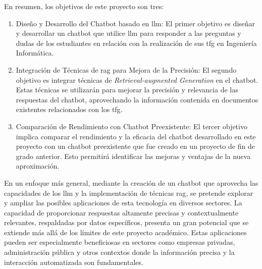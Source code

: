 En resumen, los objetivos de este proyecto son tres:
\begin{enumerate}
    \item Diseño y Desarrollo del Chatbot basado en \acrshort{llm}: El primer objetivo es diseñar y desarrollar un chatbot que utilice \acrlong{llm} para responder a las preguntas y dudas de los estudiantes en relación con la realización de sus \acrlong{tfg} en Ingeniería Informática.
    
    \item Integración de Técnicas de \acrshort{rag} para Mejora de la Precisión: El segundo objetivo es integrar técnicas de \textit{Retrieval-augmented Generation} en el chatbot. Estas técnicas se utilizarán para mejorar la precisión y relevancia de las respuestas del chatbot, aprovechando la información contenida en documentos existentes relacionados con los \acrshort{tfg}.

    \item Comparación de Rendimiento con Chatbot Preexistente: El tercer objetivo implica comparar el rendimiento y la eficacia del chatbot desarrollado en este proyecto con un chatbot preexistente que fue creado en un proyecto de fin de grado anterior. Esto permitirá identificar las mejoras y ventajas de la nueva aproximación.
    
\end{enumerate}

En un enfoque más general, mediante la creación de un chatbot que aprovecha las capacidades de los \acrshort{llm} y la implementación de técnicas \acrshort{rag}, se pretende explorar y ampliar las posibles aplicaciones de esta tecnología en diversos sectores. La capacidad de proporcionar respuestas altamente precisas y contextualmente relevantes, respaldadas por datos específicos, presenta un gran potencial que se extiende más allá de los límites de este proyecto académico. Estas aplicaciones pueden ser especialmente beneficiosas en sectores como empresas privadas, administración pública y otros contextos donde la información precisa y la interacción automatizada son fundamentales.





